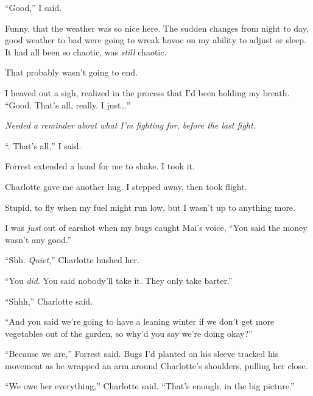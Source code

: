 ``Good,'' I said.



Funny, that the weather was so nice here.  The sudden changes from night to day, good weather to bad were going to wreak havoc on my ability to adjust or sleep.  It had all been so chaotic, was \emph{still} chaotic.



That probably wasn't going to end.



I heaved out a sigh, realized in the process that I'd been holding my breath.  ``Good.  That's all, really.  I just\ldots''



\emph{Needed a reminder about what I'm fighting for, before the last fight}.



``\ldotsyeah.  That's all,'' I said.



Forrest extended a hand for me to shake.  I took it.



Charlotte gave me another hug.  I stepped away, then took flight.



Stupid, to fly when my fuel might run low, but I wasn't up to anything more.



I was \emph{just} out of earshot when my bugs caught Mai's voice, ``You said the money wasn't any good.''



``Shh.  \emph{Quiet},'' Charlotte hushed her.



``You \emph{did}.  You said nobody'll take it.  They only take barter.''



``Shhh,'' Charlotte said.



``And you said we're going to have a leaning winter if we don't get more vegetables out of the garden, so why'd you say we're doing okay?''



``Because we are,'' Forrest said.  Bugs I'd planted on his sleeve tracked his movement as he wrapped an arm around Charlotte's shoulders, pulling her close.



``We owe her everything,'' Charlotte said.  ``That's enough, in the big picture.''



